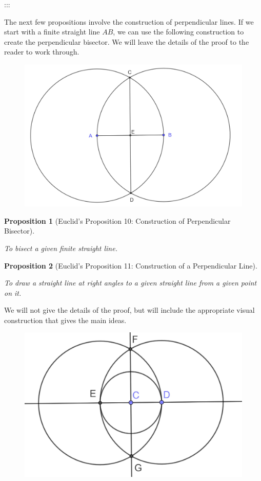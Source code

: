 \documentclass[
]{book}
\newtheorem{proposition}{Proposition}[chapter]
\theoremstyle{definition}
\theoremstyle{definition}
\theoremstyle{definition}
\theoremstyle{definition}
\theoremstyle{remark}
\begin{document}
:::

The next few propositions involve the construction of perpendicular lines. If we start with a finite straight line \(AB\), we can use the following construction to create the perpendicular bisector. We will leave the details of the proof to the reader to work through.

\begin{figure}

{\centering \includegraphics[width=0.6\linewidth]{images/Prop10} 

}

\end{figure}

\begin{proposition}[Euclid's Proposition 10: Construction of Perpendicular Bisector]
\protect\hypertarget{prp:prop10}{}\label{prp:prop10}

To bisect a given finite straight line.

\end{proposition}

\begin{proposition}[Euclid's Proposition 11: Construction of a Perpendicular Line]
\protect\hypertarget{prp:prop11}{}\label{prp:prop11}

To draw a straight line at right angles to a given straight line from a given point on it.

\end{proposition}

We will not give the details of the proof, but will include the appropriate visual construction that gives the main ideas.

\begin{figure}

{\centering \includegraphics[width=0.45\linewidth]{images/Prop11} 

}

\end{figure}
\end{document}

